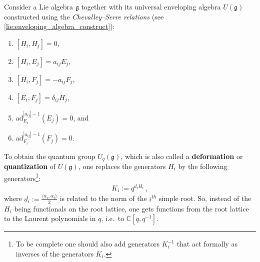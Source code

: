     \begin{construct}
        Consider a Lie algebra $\mathfrak{g}$ together with its universal enveloping algebra $U(\mathfrak{g})$ constructed using the \textit{Chevalley--Serre relations} (see \cref{lie:enveloping_algebra_construct}):
        \begin{enumerate}
            \item $[H_i,H_j] = 0$,
            \item $[H_i,E_j] = a_{ij}E_j$,
            \item $[H_i,F_j] = -a_{ij}F_j$,
            \item $[E_i,F_j] = \delta_{ij}H_j$,
            \item $\text{ad}_{E_i}^{|a_{ij}|-1}(E_j) = 0$, and
            \item $\text{ad}_{F_i}^{|a_{ij}|-1}(F_j) = 0$.
        \end{enumerate}
         To obtain the quantum group $U_q(\mathfrak{g})$, which is also called a \textbf{deformation} or \textbf{quantization} of $U(\mathfrak{g})$, one replaces the generators $H_i$ by the following generators\footnote{To be complete one should also add generators $K_i^{-1}$ that act formally as inverses of the generators $K_i$.}:
        \begin{gather}
            K_i := q^{d_iH_i}\,,
        \end{gather}
        where $d_i := \frac{\langle\alpha_i,\alpha_i\rangle}{2}$ is related to the norm of the $i^{th}$ simple root. So, instead of the $H_i$ being functionals on the root lattice, one gets functions from the root lattice to the Laurent polynomials in $q$, i.e.~to $\mathbb{C}[q,q^{-1}]$.


\end{construct}
